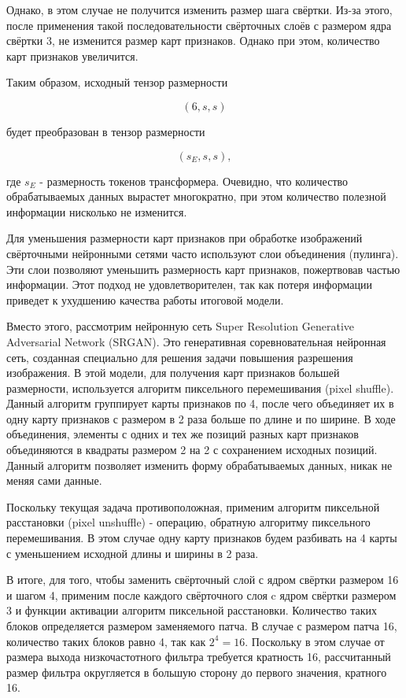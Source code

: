 \documentclass[times,specification,annotation]{itmo-student-thesis}
\begin{document}
Однако, в этом случае не получится изменить размер шага свёртки. Из-за этого, после применения такой последовательности свёрточных слоёв с размером ядра свёртки 3, не изменится размер карт признаков. Однако при этом, количество карт признаков увеличится.

Таким образом, исходный тензор размерности

$$(6, s, s)$$

будет преобразован в тензор размерности 

$$
(s_E, s, s),
$$

где $s_E$ - размерность токенов трансформера. Очевидно, что количество обрабатываемых данных вырастет многократно, при этом количество полезной информации нисколько не изменится. 

Для уменьшения размерности карт признаков при обработке изображений свёрточными нейронными сетями часто используют слои объединения (пулинга). Эти слои позволяют уменьшить размерность карт признаков, пожертвовав частью информации. Этот подход не удовлетворителен, так как потеря информации приведет к ухудшению качества работы итоговой модели. 

Вместо этого, рассмотрим нейронную сеть Super Resolution Generative Adversarial Network (SRGAN). Это генеративная соревновательная нейронная сеть, созданная специально для решения задачи повышения разрешения изображения. В этой модели, для получения карт признаков большей размерности, используется алгоритм пиксельного перемешивания (pixel shuffle). Данный алгоритм группирует карты признаков по 4, после чего объединяет их в одну карту признаков с размером в 2 раза больше по длине и по ширине. В ходе объединения, элементы с одних и тех же позиций разных карт признаков объединяются в квадраты размером 2 на 2 с сохранением исходных позиций. Данный алгоритм позволяет изменить форму обрабатываемых данных, никак не меняя сами данные.

Поскольку текущая задача противоположная, применим алгоритм пиксельной расстановки (pixel unshuffle) - операцию, обратную алгоритму пиксельного перемешивания. В этом случае одну карту признаков будем разбивать на 4 карты с уменьшением исходной длины и ширины в 2 раза. 

В итоге, для того, чтобы заменить свёрточный слой с ядром свёртки размером 16 и шагом 4, применим после каждого свёрточного слоя c ядром свёртки размером 3 и функции активации алгоритм пиксельной расстановки. Количество таких блоков определяется размером заменяемого патча. В случае с размером патча 16, количество таких блоков равно 4, так как $2^4 = 16$. Поскольку в этом случае от размера выхода низкочастотного фильтра требуется кратность 16, рассчитанный размер фильтра округляется в большую сторону до первого значения, кратного 16.
\end{document}
